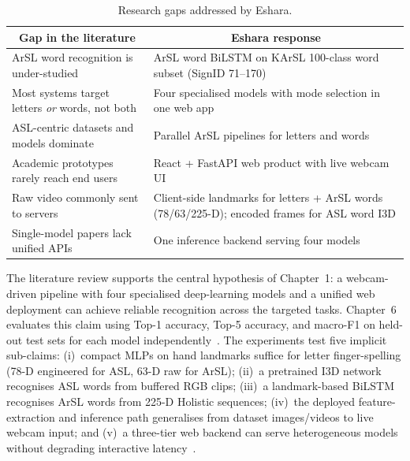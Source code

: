 \begin{table}[H]
\centering
\caption{Research gaps addressed by Eshara.}
\label{tab:research-gap}
\begin{tabular}{|p{}|p{}|}
\hline
\multicolumn{1}{|c|}{\textbf{Gap in the literature}} & \multicolumn{1}{|c|}{\textbf{Eshara response}}\\
\hline
ArSL word recognition is under-studied & ArSL word BiLSTM on KArSL 100-class word subset (SignID 71--170) \\
\hline
Most systems target letters \emph{or} words, not both & Four specialised models with mode selection in one web app \\
\hline
ASL-centric datasets and models dominate & Parallel ArSL pipelines for letters and words \\
\hline
Academic prototypes rarely reach end users & React + FastAPI web product with live webcam UI \\
\hline
Raw video commonly sent to servers & Client-side landmarks for letters + ArSL words (78/63/225-D); encoded frames for ASL word I3D \\
\hline
Single-model papers lack unified APIs & One inference backend serving four models \\
\hline
\end{tabular}
\end{table}
\vspace{0.2cm}

\noindent The literature review supports the central hypothesis of Chapter~1: a webcam-driven pipeline with four specialised deep-learning models and a unified web deployment can achieve reliable recognition across the targeted tasks. Chapter~6 evaluates this claim using Top-1 accuracy, Top-5 accuracy, and macro-F1 on held-out test sets for each model independently~\cite{li2020wlasl,sidig2021karsl}. The experiments test five implicit sub-claims: (i)~compact MLPs on hand landmarks suffice for letter finger-spelling (78-D engineered for ASL, 63-D raw for ArSL); (ii)~a pretrained I3D network recognises ASL words from buffered RGB clips; (iii)~a landmark-based BiLSTM recognises ArSL words from 225-D Holistic sequences; (iv)~the deployed feature-extraction and inference path generalises from dataset images/videos to live webcam input; and (v)~a three-tier web backend can serve heterogeneous models without degrading interactive latency~\cite{zhang2020mediapipe,fastapi,rfc6455}.\par\vspace{0.3cm}

